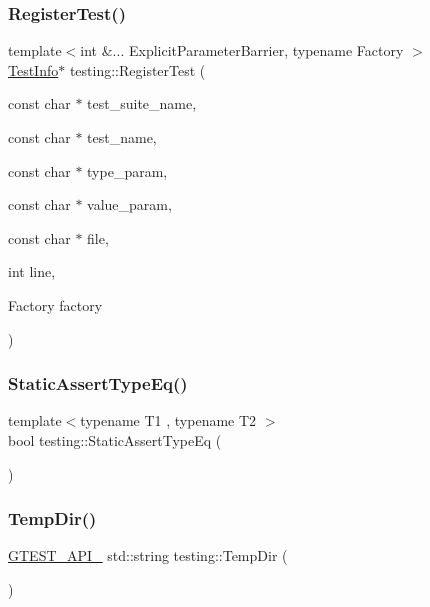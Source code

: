 \subsubsection{\texorpdfstring{Register\+Test()}{RegisterTest()}}
{\footnotesize\ttfamily template$<$int \&... Explicit\+Parameter\+Barrier, typename Factory $>$ \\
\hyperlink{classtesting_1_1TestInfo}{Test\+Info}$\ast$ testing\+::\+Register\+Test (\begin{DoxyParamCaption}\item[{const char $\ast$}]{test\+\_\+suite\+\_\+name,  }\item[{const char $\ast$}]{test\+\_\+name,  }\item[{const char $\ast$}]{type\+\_\+param,  }\item[{const char $\ast$}]{value\+\_\+param,  }\item[{const char $\ast$}]{file,  }\item[{int}]{line,  }\item[{Factory}]{factory }\end{DoxyParamCaption})}

\mbox{\label{namespacetesting_a661e70fc6afeb5c085eed3716aa45059}} 
\subsubsection{\texorpdfstring{Static\+Assert\+Type\+Eq()}{StaticAssertTypeEq()}}
{\footnotesize\ttfamily template$<$typename T1 , typename T2 $>$ \\
bool testing\+::\+Static\+Assert\+Type\+Eq (\begin{DoxyParamCaption}{ }\end{DoxyParamCaption})}

\mbox{\label{namespacetesting_abcf5181cecc3c07915dceb3de46ab07f}} 
\subsubsection{\texorpdfstring{Temp\+Dir()}{TempDir()}}
{\footnotesize\ttfamily \hyperlink{gtest-port_8h_aa73be6f0ba4a7456180a94904ce17790}{G\+T\+E\+S\+T\+\_\+\+A\+P\+I\+\_\+} std\+::string testing\+::\+Temp\+Dir (\begin{DoxyParamCaption}{ }\end{DoxyParamCaption})}

